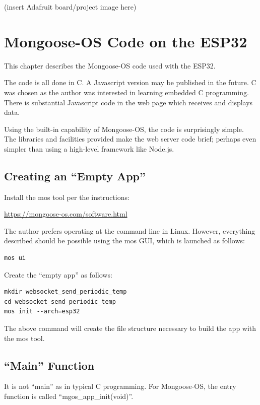 \documentclass[letterpaper,]{book}
\begin{document}
(insert Adafruit board/project image here)

\chapter{Mongoose-OS Code on the
ESP32}\label{mongoose-os-code-on-the-esp32}

This chapter describes the Mongoose-OS code used with the ESP32.

The code is all done in C. A Javascript version may be published in the
future. C was chosen as the author was interested in learning embedded C
programming. There is substantial Javascript code in the web page which
receives and displays data.

Using the built-in capability of Mongoose-OS, the code is surprisingly
simple. The libraries and facilities provided make the web server code
brief; perhaps even simpler than using a high-level framework like
Node.js.

\section{\texorpdfstring{Creating an ``Empty
App''}{Creating an Empty App}}\label{creating-an-empty-app}

Install the mos tool per the instructions:

\url{https://mongoose-os.com/software.html}

The author prefers operating at the command line in Linux. However,
everything described should be possible using the mos GUI, which is
launched as follows:

\begin{verbatim}
mos ui
\end{verbatim}

Create the ``empty app'' as follows:

\begin{verbatim}
mkdir websocket_send_periodic_temp
cd websocket_send_periodic_temp
mos init --arch=esp32
\end{verbatim}

The above command will create the file structure necessary to build the
app with the mos tool.

\section{\texorpdfstring{``Main''
Function}{Main Function}}\label{main-function}

It is not ``main'' as in typical C programming. For Mongoose-OS, the
entry function is called ``mgos\_app\_init(void)''.
\end{document}
